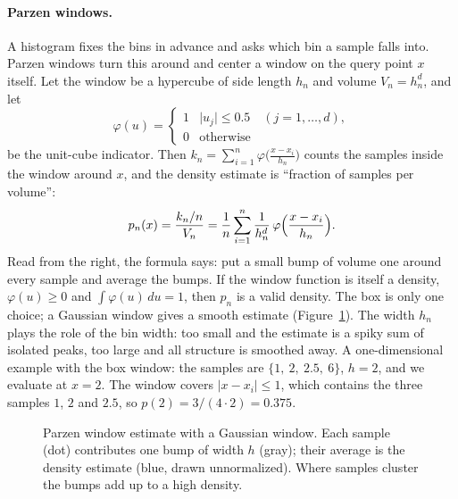 \paragraph{Parzen windows.}
A histogram fixes the bins in advance and asks which bin a sample falls into.
Parzen windows turn this around and center a window on the query point $x$
itself. Let the window be a hypercube of side length $h_n$ and volume
$V_n = h_n^d$, and let
\begin{equation}
  \varphi(u) =
  \begin{cases}
    1 & \lvert u_j\rvert\le 0.5 \quad (j = 1,\dots,d),\\
    0 & \text{otherwise}
  \end{cases}
\end{equation}
\noindent
be the unit-cube indicator. Then
$k_n = \sum_{i=1}^n \varphi\bigl(\frac{x-x_i}{h_n}\bigr)$ counts the samples
inside the window around $x$, and the density estimate is ``fraction of samples
per volume'':
\begin{equation}
  p_n(x) = \frac{k_n/n}{V_n}
  = \frac{1}{n}\sum_{i=1}^{n}\frac{1}{h_n^d}\,
    \varphi\Bigl(\frac{x-x_i}{h_n}\Bigr).
  \label{eq:parzen}
\end{equation}
\noindent
Read from the right, the formula says: put a small bump of volume one around
every sample and average the bumps. If the window function is itself a density,
$\varphi(u)\ge 0$ and $\int\varphi(u)\,du = 1$, then $p_n$ is a valid density.
The box is only one choice; a Gaussian window gives a smooth estimate
(Figure~\ref{fig:parzen}). The width $h_n$ plays the role of the bin width: too
small and the estimate is a spiky sum of isolated peaks, too large and all
structure is smoothed away. A one-dimensional example with the box window: the
samples are $\{1,\ 2,\ 2.5,\ 6\}$, $h = 2$, and we evaluate at $x = 2$. The window
covers $\lvert x-x_i\rvert\le 1$, which contains the three samples $1$, $2$ and
$2.5$, so $p(2) = 3/(4\cdot 2) = 0.375$.

\begin{figure}[ht]
  \centering
  \caption{Parzen window estimate with a Gaussian window. Each sample (dot)
  contributes one bump of width $h$ (gray); their average is the density
  estimate (blue, drawn unnormalized). Where samples cluster the bumps add up
  to a high density.}
  \label{fig:parzen}
\end{figure}

